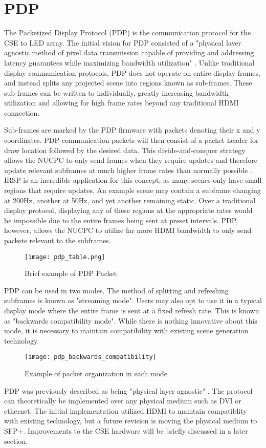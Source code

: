 \section{PDP}
The Packetized Display Protocol (PDP) is the communication protocol for the CSE to LED array. The initial vision for PDP consisted of a "physical layer agnostic method of pixel data transmission capable of providing and addressing latency guarantees while maximizing bandwidth utilization" \cite{pdp_ieee}. Unlike traditional display communication protocols, PDP does not operate on entire display frames, and instead splits any projected scene into regions known as sub-frames. These sub-frames can be written to individually, greatly increasing bandwidth utilization and allowing for high frame rates beyond any traditional HDMI connection. \par
Sub-frames are marked by the PDP firmware with packets denoting their x and y coordinates. PDP communication packets will then consist of a packet header for draw location followed by the desired data. This divide-and-conquer strategy allows the NUCPC to only send frames when they require updates and therefore update relevant subframes at much higher frame rates than normally possible \cite{chris}. IRSP is an incredible application for this concept, as many scenes only have small regions that require updates. An example scene may contain a subframe changing at 200Hz, another at 50Hz, and yet another remaining static. Over a traditional display protocol, displaying any of these regions at the appropriate rates would be impossible due to the entire frames being sent at preset intervals. PDP, however, allows the NUCPC to utilize far more HDMI bandwidth to only send packets relevant to the subframes.\par
\begin{figure}[h]
	\texttt{[image: pdp\_table.png]}
	\centering
	\caption{Brief example of PDP Packet}
	\centering
\end{figure}
PDP can be used in two modes. The method of splitting and refreshing subframes is known as "streaming mode". Users may also opt to use it in a typical display mode where the entire frame is sent at a fixed refresh rate. This is known as "backwards compatibility mode". While there is nothing innovative about this mode, it is necessary to maintain compatibility with existing scene generation technology.\par
\begin{figure}[h]
	\texttt{[image: pdp\_backwards\_compatibility]}
	\centering
	\caption{Example of packet organization in each mode}
	\centering
\end{figure}
PDP was previously described as being "physical layer agnostic" \cite{pdp_ieee}. The protocol can theoretically be implemented over any physical medium such as DVI or ethernet. The initial implementation utilized HDMI to maintain compatiblity with existing technology, but a future revision is moving the physical medium to SFP+. Improvements to the CSE hardware will be briefly discussed in a later section.